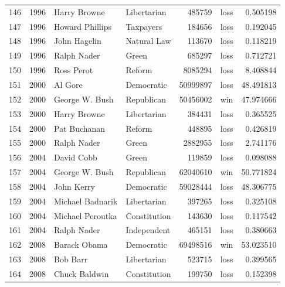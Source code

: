 \documentclass[
  letterpaper,
  DIV=11,
  numbers=noendperiod]{scrreprt}
\begin{document}
\begin{tabular}{lrllrlr}
146 &  1996 &            Harry Browne &            Libertarian &        485759 &   loss &   0.505198 \\
147 &  1996 &         Howard Phillips &              Taxpayers &        184656 &   loss &   0.192045 \\
148 &  1996 &            John Hagelin &            Natural Law &        113670 &   loss &   0.118219 \\
149 &  1996 &             Ralph Nader &                  Green &        685297 &   loss &   0.712721 \\
150 &  1996 &              Ross Perot &                 Reform &       8085294 &   loss &   8.408844 \\
151 &  2000 &                 Al Gore &             Democratic &      50999897 &   loss &  48.491813 \\
152 &  2000 &          George W. Bush &             Republican &      50456002 &    win &  47.974666 \\
153 &  2000 &            Harry Browne &            Libertarian &        384431 &   loss &   0.365525 \\
154 &  2000 &            Pat Buchanan &                 Reform &        448895 &   loss &   0.426819 \\
155 &  2000 &             Ralph Nader &                  Green &       2882955 &   loss &   2.741176 \\
156 &  2004 &              David Cobb &                  Green &        119859 &   loss &   0.098088 \\
157 &  2004 &          George W. Bush &             Republican &      62040610 &    win &  50.771824 \\
158 &  2004 &              John Kerry &             Democratic &      59028444 &   loss &  48.306775 \\
159 &  2004 &        Michael Badnarik &            Libertarian &        397265 &   loss &   0.325108 \\
160 &  2004 &        Michael Peroutka &           Constitution &        143630 &   loss &   0.117542 \\
161 &  2004 &             Ralph Nader &            Independent &        465151 &   loss &   0.380663 \\
162 &  2008 &            Barack Obama &             Democratic &      69498516 &    win &  53.023510 \\
163 &  2008 &                Bob Barr &            Libertarian &        523715 &   loss &   0.399565 \\
164 &  2008 &           Chuck Baldwin &           Constitution &        199750 &   loss &   0.152398 \\

\end{tabular}
\end{document}

